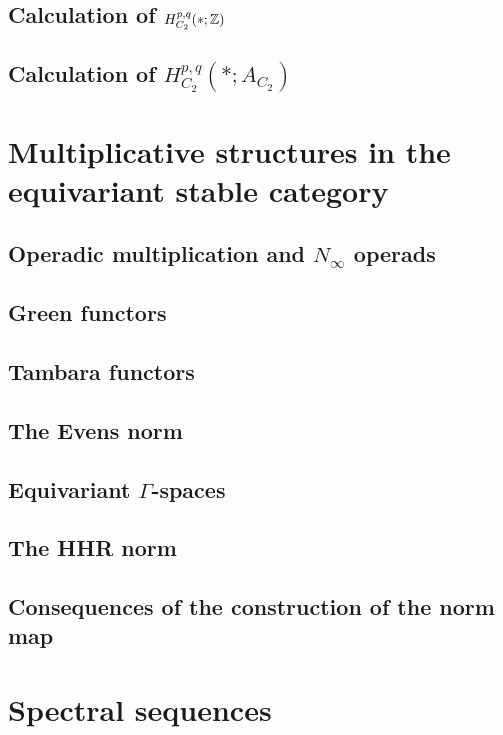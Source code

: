 \documentclass[openany]{style_EHT}
\begin{document}
\section{Calculation of $H_{C_2}^{p,q}(*; \mathbb Z)$}
	
\section{Calculation of $H_{C_2}^{p,q}(*; A_{C_2})$}
	

\chapter{Multiplicative structures in the equivariant stable category}
\section{Operadic multiplication and $N_\infty$ operads}
	
\section{Green functors}
	
\section{Tambara functors}
	
\section{The Evens norm}
	
\section{Equivariant $\Gamma$-spaces}
	
\section{The HHR norm}
	
\section{Consequences of the construction of the norm map}
	

\chapter{Spectral sequences}
\end{document}
